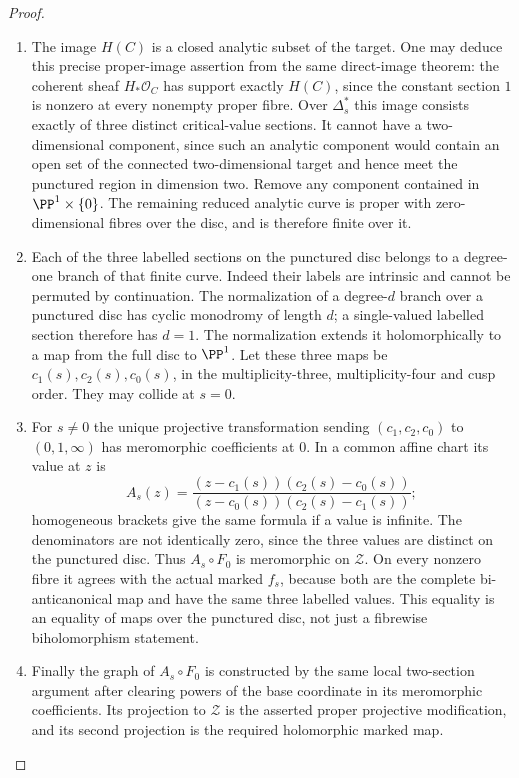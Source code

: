 \begin{proof}
\begin{enumerate}[label=\arabic*.,leftmargin=*]
\item The image $H(C)$ is a closed analytic subset of the target.
One may deduce this precise proper-image assertion from the same
direct-image theorem: the coherent sheaf
$H_*\mathcal O_C$ has support exactly $H(C)$, since the
constant section $1$ is nonzero at every nonempty proper fibre.
Over $\Delta_s^*$ this image consists exactly of three distinct
critical-value sections. It cannot have a two-dimensional
component, since such an analytic component would contain an
open set of the connected two-dimensional target and hence meet
the punctured region in dimension two. Remove any component
contained in $\PP^1\times\{0\}$. The remaining reduced
analytic curve is proper with zero-dimensional fibres over the
disc, and is therefore finite over it.

\item Each of the three labelled sections on the punctured disc belongs
to a degree-one branch of that finite curve. Indeed their labels
are intrinsic and cannot be permuted by continuation. The
normalization of a degree-$d$ branch over a punctured disc has
cyclic monodromy of length $d$; a single-valued labelled section
therefore has $d=1$. The normalization extends it holomorphically
to a map from the full disc to $\PP^1$. Let these three maps be
$c_1(s),c_2(s),c_0(s)$, in the multiplicity-three,
multiplicity-four and cusp order. They may collide at $s=0$.

\item For $s\ne0$ the unique projective transformation sending
$(c_1,c_2,c_0)$ to $(0,1,\infty)$ has meromorphic coefficients
at $0$. In a common affine chart its value at $z$ is
\[
 A_s(z)=
 \frac{(z-c_1(s))(c_2(s)-c_0(s))}
      {(z-c_0(s))(c_2(s)-c_1(s))};
\]
homogeneous brackets give the same formula if a value is infinite.
The denominators are not identically zero, since the three values
are distinct on the punctured disc. Thus $A_s\circ F_0$ is
meromorphic on $\mathcal Z$. On every nonzero fibre it agrees
with the actual marked $f_s$, because both are the complete
bi-anticanonical map and have the same three labelled values.
This equality is an equality of maps over the punctured disc,
not just a fibrewise biholomorphism statement.

\item Finally the graph of $A_s\circ F_0$ is constructed by the same
local two-section argument after clearing powers of the base
coordinate in its meromorphic coefficients. Its projection to
$\mathcal Z$ is the asserted proper projective modification,
and its second projection is the required holomorphic marked map.
\end{enumerate}
\end{proof}

